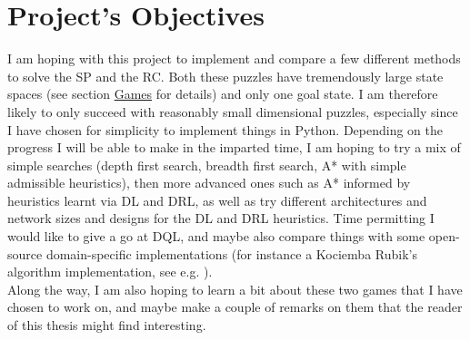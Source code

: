 
\newpage
\section{Project's Objectives}

I am hoping with this project to implement and compare a few different methods to solve the SP and the RC. Both these puzzles have tremendously large state spaces (see section \hyperref[sec:Games]{Games} for details) and only one goal state. I am therefore likely to only succeed with reasonably small dimensional puzzles, especially since I have chosen for simplicity to implement things in Python.
Depending on the progress I will be able to make in the imparted time, I am hoping to try a mix of simple searches (depth first search, breadth first search, A* with simple admissible heuristics), then more advanced ones such as A* informed by heuristics learnt via DL and DRL, as well as try different architectures and network sizes and designs for the DL and DRL heuristics. Time permitting I would like to give a go at DQL, and maybe also compare things with some open-source domain-specific implementations (for instance a Kociemba Rubik's algorithm implementation, see e.g. \cite{Kociemba}).
\\
Along the way, I am also hoping to learn a bit about these two games that I have chosen to work on, and maybe make a couple of remarks on them that the reader of this thesis might find interesting.
